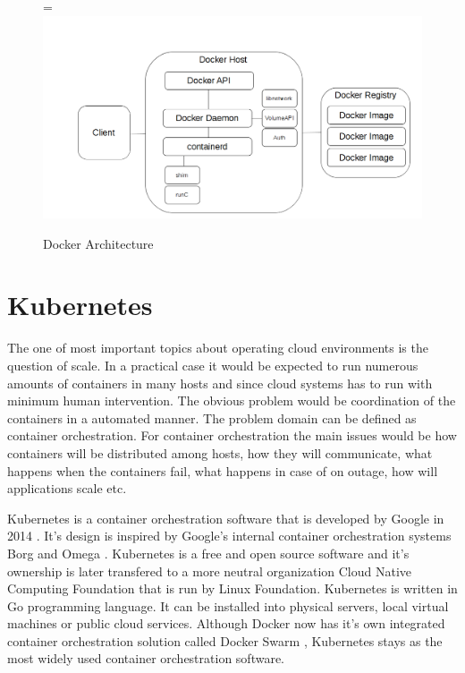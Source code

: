 \documentclass[12pt,oneandhalf,chaparabic,ceng,ms,eng,oneside,pntc]{gsufbe}
\makeatletter
\let\old@includegraphics\includegraphics
\renewcommand{\includegraphics}[2][,]{%
  \setbox9=\hbox{\old@includegraphics[#1]{#2}}%
  \ifdim\wd9>\textwidth
    \old@includegraphics[#1,width=\textwidth]{#2}%
  \else
    \old@includegraphics[#1]{#2}%
  \fi%
}
\makeatother
\begin{document}
\begin{figure}
\centering
\includegraphics[]{docker-arch.png}
\caption{Docker Architecture}
\label{fig:dockerarch}
\end{figure}

\section{Kubernetes}
The one of most important topics about operating cloud environments is the question of scale. In a
practical case it would be expected to run numerous amounts of containers in many hosts and since
cloud systems has to run with minimum human intervention. The obvious problem would be coordination
of the containers in a automated manner. The problem domain can be defined as container orchestration.
For container orchestration the main issues would be how containers will be distributed among hosts,
how they will communicate, what happens when the containers fail, what happens in case of on outage,
how will applications scale etc.

Kubernetes is a container orchestration software that is developed by Google in 2014 \cite{Kubernetes}.
It's design is
inspired by Google's internal container orchestration systems Borg and Omega \cite{burns_borg_2016}.
Kubernetes is a free and open source software and it's ownership is later transfered to a more neutral
organization Cloud Native Computing Foundation \cite{cncf} that is run by Linux Foundation. 
\cite{linux_foundation} Kubernetes is written in Go programming language.
It can be installed into physical servers, local virtual machines or public cloud services. Although
Docker now has it's own integrated container orchestration solution called Docker Swarm 
\cite{docker_swarm}, Kubernetes stays as the most widely used container orchestration software.
\end{document}
